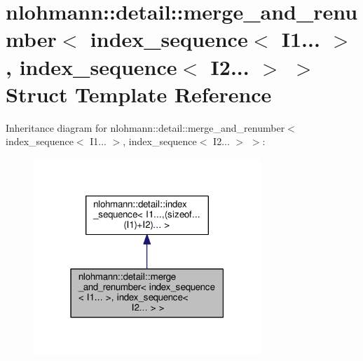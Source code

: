 \hypertarget{structnlohmann_1_1detail_1_1merge__and__renumber_3_01index__sequence_3_01I1_8_8_8_01_4_00_01inde4885d6f1d93a04f25932afbd429c4793}{}\section{nlohmann\+:\+:detail\+:\+:merge\+\_\+and\+\_\+renumber$<$ index\+\_\+sequence$<$ I1... $>$, index\+\_\+sequence$<$ I2... $>$ $>$ Struct Template Reference}
\label{structnlohmann_1_1detail_1_1merge__and__renumber_3_01index__sequence_3_01I1_8_8_8_01_4_00_01inde4885d6f1d93a04f25932afbd429c4793}


Inheritance diagram for nlohmann\+:\+:detail\+:\+:merge\+\_\+and\+\_\+renumber$<$ index\+\_\+sequence$<$ I1... $>$, index\+\_\+sequence$<$ I2... $>$ $>$\+:\nopagebreak
\begin{figure}[H]
\begin{center}
\leavevmode
\includegraphics[width=243pt]{structnlohmann_1_1detail_1_1merge__and__renumber_3_01index__sequence_3_01I1_8_8_8_01_4_00_01inde58a580c1f5a37a79769abd61aded5e29}
\end{center}
\end{figure}


